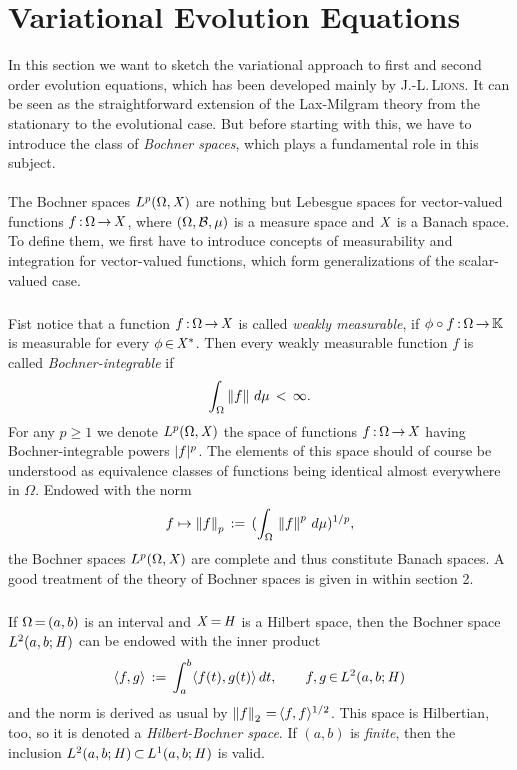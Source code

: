 \documentclass[11pt,twoside]{article}
\begin{document}
\section{Variational Evolution Equations}                                      %
In this section we want to sketch the variational approach
to first and second order evolution equations,
which has been developed mainly by \textsc{J.-L.\,Lions}.
It can be seen as the straightforward extension of
the {Lax-Milgram} theory from the stationary to the evolutional case.
But before starting with this,
we have to introduce the class of \textit{Bochner spaces},
which plays a fundamental role in this subject.

\paragraph{} %
The {Bochner spaces} $L^p(\Omega,\mathit{X})$ are nothing but
Lebesgue spaces for vector-valued functions $f {\,:\,} \Omega {\,\to\,} \mathit{X}$,
where $(\Omega,{\mathcal{B}},\mu)$ is a measure space and $\mathit{X}$ is a Banach space.
To define them,
we first have to introduce concepts of measurability and integration
for vector-valued functions,
which form generalizations of the scalar-valued case.

\subparagraph{} %
Fist notice that
a function $f {\,:\,} \Omega {\,\to\,} \mathit{X}$ is called \textit{weakly measurable},
if $\phi \circ f {\,:\,} \Omega {\,\to\,} {\mathbb{K}}$ is measurable
for every $\phi {\,\in\,} \mathit{X}^*$.
Then every weakly measurable function $f$ is called \textit{Bochner-integrable}
if
\[
\int_{\Omega} \left\lVert f \right\rVert \, d\mu \, < \, \infty.
\]
For any $p \geq 1$
we denote $L^p(\Omega,\mathit{X})$ the space of functions $f {\,:\,} \Omega {\,\to\,} \mathit{X}$
having Bochner-integrable powers $\abs{f} ^{p}$.
The elements of this space should of course be understood
as equivalence classes of functions
being identical almost everywhere in $\Omega$.
Endowed with the norm
\[
f \mapsto \left\lVert f \right\rVert_p \,:=\, (\int_{\Omega} \, \left\lVert f \right\rVert ^p \, d\mu)^{1/p},
\]
the Bochner spaces $L^p(\Omega,\mathit{X})$ are complete
and thus constitute Banach spaces.
A good treatment of the theory of Bochner spaces is given in \cite{DU}
within section 2.

\subparagraph{} %
If $\Omega {\,=\,} (a,b)$ is an interval and $\mathit{X} {\,=\,} \mathit{H}$ is a Hilbert space,
then the Bochner space $L^2(a,b;\mathit{H})$ can be endowed with the inner product
\[
\langle f,g \rangle \,:=\, \int_a^b \langle f(t),g(t) \rangle \,dt,
\quad \quad
f,g {\,\in\,} L^2(a,b;\mathit{H})
\]
and the norm is derived as usual by $\left\lVert f \right\rVert_2 {\,=\,} \langle f,f \rangle^{1/2}$.
This space is Hilbertian,
too,
so it is denoted a \textit{Hilbert-Bochner space}.
If $(a,b)$ is \textit{finite},
then the inclusion $L^2(a,b;\mathit{H}) {\,\subset\,} L^1(a,b;\mathit{H})$ is valid.
\end{document}
